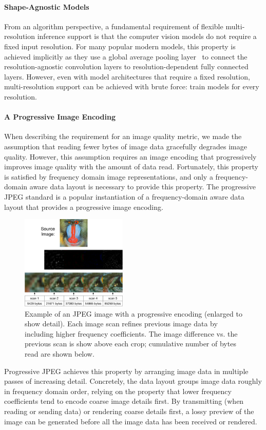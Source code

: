 \paragraph{Shape-Agnostic Models}
From an algorithm perspective, a fundamental requirement of flexible multi-resolution inference support is that the computer vision models do not require a fixed input resolution.
For many popular modern models, this property is achieved implicitly as they use a global average pooling layer~\cite{zhou2016learning} to connect the resolution-agnostic convolution layers to resolution-dependent fully connected layers.
However, even with model architectures that require a fixed resolution, multi-resolution support can be achieved with brute force: train models for every resolution.

\paragraph{A Progressive Image Encoding}
When describing the requirement for an image quality metric, we made the assumption that reading fewer bytes of image data gracefully degrades image quality.
However, this assumption requires an image encoding that progressively improves image quality with the amount of data read.
Fortunately, this property is satisfied by frequency domain image representations, and only a frequency-domain aware data layout is necessary to provide this property.
The progressive JPEG standard is a popular instantiation of a frequency-domain aware data layout that provides a progressive image encoding.

\begin{figure}
    \centering
    \includegraphics[width=0.45\textwidth]{e2e_diagrams/progressive jpeg example.pdf}
    \caption{Example of an JPEG image with a progressive encoding (enlarged to show detail). Each image scan refines previous image data by including higher frequency coefficients. The image difference vs. the previous scan is show above each crop; cumulative number of bytes read are shown below.}
    \label{fig:progressivejpeg}
\end{figure}
Progressive JPEG achieves this property by arranging image data in multiple passes of increasing detail.
Concretely, the data layout groups image data roughly in frequency domain order, relying on the property that lower frequency coefficients tend to encode coarse image details first.
By transmitting (when reading or sending data) or rendering coarse details first, a lossy preview of the image can be generated before all the image data has been received or rendered.


